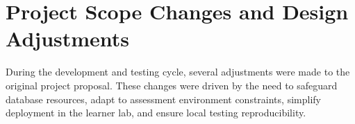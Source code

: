 \section{Project Scope Changes and Design Adjustments}
\label{sec:changes}

During the development and testing cycle, several adjustments were made to the original project proposal. These changes were driven by the need to safeguard database resources, adapt to assessment environment constraints, simplify deployment in the learner lab, and ensure local testing reproducibility.


